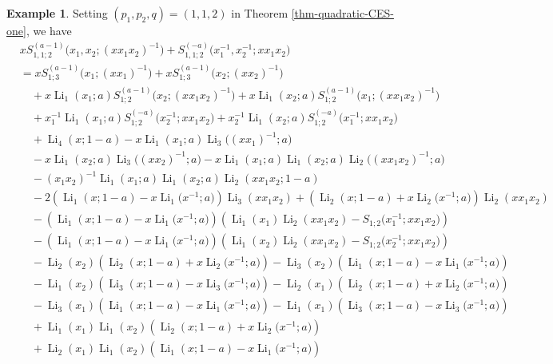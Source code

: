 \documentclass[11pt]{article}
\DeclareMathOperator{\Li}{Li}
\theoremstyle{plain}
\theoremstyle{definition}
\newtheorem{exa}[thm]{Example}
\begin{document}
\begin{exa}Setting $(p_1,p_2,q)=(1,1,2)$ in Theorem \ref{thm-quadratic-CES-one}, we have
\begin{align*}
	&xS_{1,1;2}^{(a-1)}\Big(x_1,x_2;(xx_1x_2)^{-1}\Big)+S_{1,1;2}^{(-a)}\Big(x_1^{-1},x_2^{-1};xx_1x_2\Big)\nonumber\\
	&=xS_{1;3}^{(a-1)}\Big(x_1;(xx_1)^{-1}\Big)+xS_{1;3}^{(a-1)}\Big(x_2;(xx_2)^{-1}\Big)\nonumber\\
	&\quad+x\Li_{1}(x_1;a)S_{1;2}^{(a-1)}\Big(x_2;(xx_1x_2)^{-1}\Big)+x\Li_{1}(x_2;a)S_{1;2}^{(a-1)}\Big(x_1;(xx_1x_2)^{-1}\Big)\nonumber\\
	&\quad+x_1^{-1}\Li_{1}(x_1;a)S_{1;2}^{(-a)}\Big(x_2^{-1};xx_1x_2\Big)+x_2^{-1}\Li_{1}(x_2;a)S_{1;2}^{(-a)}\Big(x_1^{-1};xx_1x_2\Big)\nonumber\\
	&\quad+\Li_{4}(x;1-a)-x\Li_{1}(x_1;a)\Li_{3}\Big((xx_1)^{-1};a\Big)\nonumber\\
	&\quad-x\Li_{1}(x_2;a)\Li_{3}\Big((xx_2)^{-1};a\Big)-x\Li_{1}(x_1;a)\Li_{1}(x_2;a)\Li_2\Big((xx_1x_2)^{-1};a\Big)\nonumber\\
	&\quad-(x_1x_2)^{-1}\Li_{1}(x_1;a)\Li_{1}(x_2;a)\Li_2(xx_1x_2;1-a)\nonumber\\
	&\quad-2\left(\Li_{1}(x;1-a)-x\Li_{1}\Big(x^{-1};a\Big)\right)\Li_{3}(xx_1x_2)+\left(\Li_{2}(x;1-a)+x\Li_{2}\Big(x^{-1};a\Big)\right)\Li_{2}(xx_1x_2)\nonumber\\
	&\quad-\left(\Li_{1}(x;1-a)-x\Li_{1}\Big(x^{-1};a\Big)\right)\left(\Li_{1}(x_1)\Li_{2}(xx_1x_2)-S_{1;2}\Big(x_1^{-1};xx_1x_2\Big)\right)\\
	&\quad-\left(\Li_{1}(x;1-a)-x\Li_{1}\Big(x^{-1};a\Big)\right)\left(\Li_{1}(x_2)\Li_{2}(xx_1x_2)-S_{1;2}\Big(x_2^{-1};xx_1x_2\Big)\right)\\
	&\quad-\Li_{2}(x_2)\left(\Li_{2}(x;1-a)+x\Li_{2}\Big(x^{-1};a\Big)\right)-\Li_{3}(x_2)\left(\Li_{1}(x;1-a)-x\Li_{1}\Big(x^{-1};a\Big)\right)\\
	&\quad-\Li_{1}(x_2)\left(\Li_{3}(x;1-a)-x\Li_{3}\Big(x^{-1};a\Big)\right)-\Li_{2}(x_1)\left(\Li_{2}(x;1-a)+x\Li_{2}\Big(x^{-1};a\Big)\right)\\
	&\quad-\Li_{3}(x_1)\left(\Li_{1}(x;1-a)-x\Li_{1}\Big(x^{-1};a\Big)\right)-\Li_{1}(x_1)\left(\Li_{3}(x;1-a)-x\Li_{3}\Big(x^{-1};a\Big)\right)\\
	&\quad+\Li_{1}(x_1)\Li_{1}(x_2)\left(\Li_{2}(x;1-a)+x \Li_{2}\Big(x^{-1};a\Big)\right)\\
	&\quad+\Li_{2}(x_1)\Li_{1}(x_2)\left(\Li_{1}(x;1-a)-x \Li_{1}\Big(x^{-1};a\Big)\right)\\

\end{align*}
\end{exa}
\end{document}
